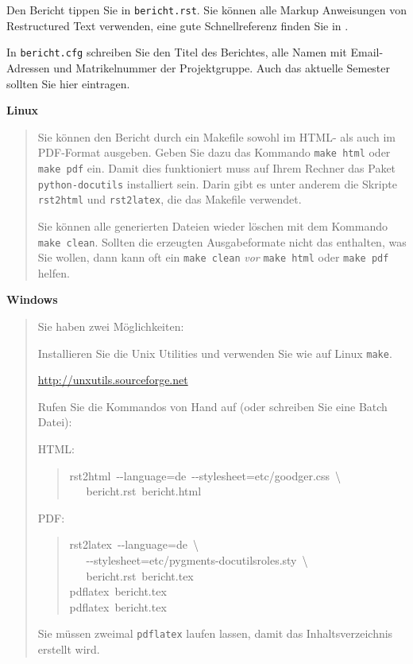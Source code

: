 \documentclass[a4paper,ngerman]{article}
\begin{document}
Den Bericht tippen Sie in \texttt{bericht.rst}. Sie können alle Markup Anweisungen
von Restructured Text verwenden, eine gute Schnellreferenz finden Sie in
\cite{QUICKREF}.

In \texttt{bericht.cfg} schreiben Sie den Titel des Berichtes, alle Namen mit
Email-Adressen und Matrikelnummer der Projektgruppe. Auch das aktuelle Semester
sollten Sie hier eintragen.

\textbf{Linux}
%
\begin{quote}

Sie können den Bericht durch ein Makefile sowohl im HTML- als auch
im PDF-Format ausgeben. Geben Sie dazu das Kommando \texttt{make html} oder \texttt{make
pdf} ein.   Damit dies funktioniert muss auf Ihrem Rechner das Paket
\texttt{python-docutils} installiert sein. Darin gibt es unter anderem die Skripte
\texttt{rst2html} und \texttt{rst2latex}, die das Makefile verwendet.

Sie können alle generierten Dateien wieder löschen mit dem Kommando \texttt{make
clean}. Sollten die erzeugten Ausgabeformate nicht das enthalten, was Sie
wollen, dann kann oft ein \texttt{make clean} \emph{vor} \texttt{make html} oder \texttt{make
pdf} helfen.

\end{quote}

\textbf{Windows}
%
\begin{quote}

Sie haben zwei Möglichkeiten:
\begin{list}{.}
{
\setlength{\rightmargin}{\leftmargin}
}

\item Installieren Sie die Unix Utilities und verwenden Sie wie auf Linux
\texttt{make}.

\url{http://unxutils.sourceforge.net}

\item Rufen Sie die Kommandos von Hand auf (oder schreiben Sie eine
Batch Datei):

HTML:
%
\begin{quote}{\ttfamily \raggedright \noindent
rst2html~-{}-language=de~-{}-stylesheet=etc/goodger.css~\textbackslash{}\\
~~~bericht.rst~bericht.html
}
\end{quote}

PDF:
%
\begin{quote}{\ttfamily \raggedright \noindent
rst2latex~-{}-language=de~\textbackslash{}\\
~~~-{}-stylesheet=etc/pygments-docutilsroles.sty~\textbackslash{}\\
~~~bericht.rst~bericht.tex\\
pdflatex~bericht.tex\\
pdflatex~bericht.tex
}
\end{quote}

Sie müssen zweimal \texttt{pdflatex} laufen lassen, damit das
Inhaltsverzeichnis erstellt wird.
\end{list}

\end{quote}
\end{document}
